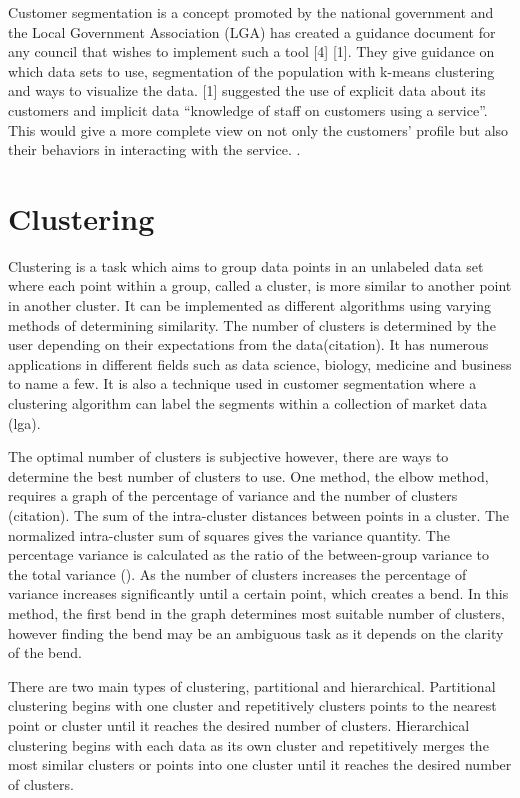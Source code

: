 Customer segmentation is a concept promoted by the national government and the Local Government Association (LGA) has created a guidance document for any council that wishes to implement such a tool [4] [1]. They give guidance on which data sets to use, segmentation of the population with k-means clustering and ways to visualize the data. [1] suggested the use of explicit data about its customers and implicit data “knowledge of staff on customers using a service”. This would give a more complete view on not only the customers’ profile but also their behaviors in interacting with the service.
. \par

\section{Clustering}

Clustering is a task which aims to group data points in an unlabeled data set where each point within a group, called a cluster, is more similar to another point in another cluster. It can be implemented as different algorithms using varying methods of determining similarity. The number of clusters is determined by the user depending on their expectations from the data(citation). It has numerous applications in different fields such as data science, biology, medicine and business to name a few. It is also a technique used in customer segmentation where a clustering algorithm can label the segments within a collection of market data (lga). \par


The optimal number of clusters is subjective however, there are ways to determine the best number of clusters to use. One method, the elbow method, requires a graph of the percentage of variance and the number of clusters (citation). The sum of the intra-cluster distances between points in a cluster. The normalized intra-cluster sum of squares gives the variance quantity. The percentage variance is calculated as the ratio of the between-group variance to the total variance (). As the number of clusters increases the percentage of variance increases significantly until a certain point, which creates a bend. In this method, the first bend in the graph determines most suitable number of clusters, however finding the bend may be an ambiguous task as it depends on the clarity of the bend.\par

There are two main types of clustering, partitional and hierarchical. Partitional clustering begins with one cluster and repetitively clusters points to the nearest point or cluster until it reaches the desired number of clusters. Hierarchical clustering begins with each data as its own cluster and repetitively merges the most similar clusters or points into one cluster until it reaches the desired number of clusters. \par

